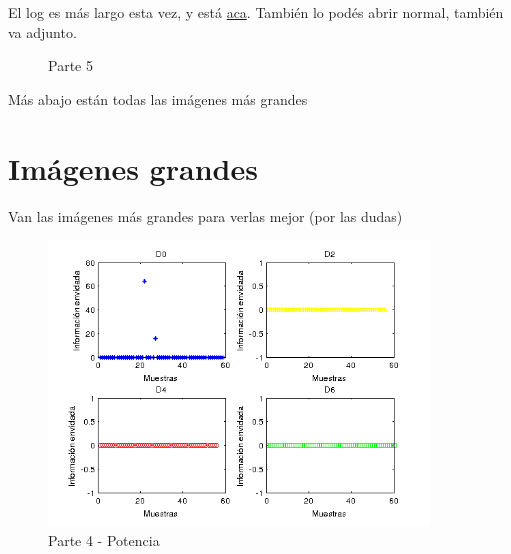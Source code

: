 \documentclass[spanish,12pt,a4paper,titlepage]{report}
\begin{document}
El log es más largo esta vez, y está \href{parte5.txt}{aca}. También lo podés abrir normal, también va adjunto.

\begin{figure} [h!]
  \centering
  \caption{Parte 5}
  \label{fig:parte5}
\end{figure}

Más abajo están todas las imágenes más grandes

\newpage
\section{Imágenes grandes}
Van las imágenes más grandes para verlas mejor (por las dudas)

\begin{figure}[h!]
	\centering
	\includegraphics[width=0.9\textwidth]{./Pics/4P}
	\caption{Parte 4 - Potencia}
	\label{fig:}
\end{figure}
\end{document}
